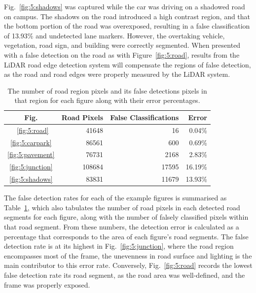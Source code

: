 Fig.~\ref{fig:5:shadows} was captured while the car was driving on a shadowed road on campus. The shadows on the road introduced a high contrast region, and that the bottom portion of the road was overexposed, resulting in a false classification of 13.93\% and undetected lane markers. However, the overtaking vehicle, vegetation, road sign, and building were correctly segmented. When presented with a false detection on the road as with Figure~\ref{fig:5:road}, results from the LiDAR road edge detection system will compensate the regions of false detection, as the road and road edges were properly measured by the LiDAR system. 

\begin{table}[H]
	\renewcommand{\arraystretch}{1.3}
	\caption[Semantic segmentation accuracy]{The number of road region pixels and its false detections pixels in that region for each figure along with their error percentages. }
	\label{tabpixelcount}
	\centering
	\begin{tabular}{crrr}
		\toprule
		        Fig.         & Road Pixels & False Classifications &   Error \\ \midrule
		 ~\ref{fig:5:road}   &       41648 &                    16 &  0.04\% \\
		\ref{fig:5:carpark}  &       86561 &                   600 &  0.69\% \\
		\ref{fig:5:pavement} &       76731 &                  2168 &  2.83\% \\
		\ref{fig:5:junction} &      108684 &                 17595 & 16.19\% \\
		\ref{fig:5:shadows}  &       83831 &                 11679 & 13.93\% \\ \bottomrule
	\end{tabular}
\end{table}

The false detection rates for each of the example figures is summarised as Table~\ref{tabpixelcount}, which also tabulates the number of road pixels in each detected road segments for each figure, along with the number of falsely classified pixels within that road segment. From these numbers, the detection error is calculated as a percentage that corresponds to the area of each figure's road segments. The false detection rate is at its highest in Fig.~\ref{fig:5:junction}, where the road region encompasses most of the frame, the unevenness in road surface and lighting is the main contributor to this error rate. Conversely, Fig.~\ref{fig:5:road} records the lowest false detection rate its road segment, as the road area was well-defined, and the frame was properly exposed. 

